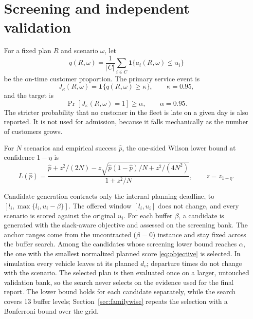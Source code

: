 \documentclass[11pt,a4paper]{article}
\begin{document}
\section{Screening and independent validation}

For a fixed plan $R$ and scenario $\omega$, let
\begin{equation}
 q(R,\omega)=\frac{1}{|C|}\sum_{i\in C}
 \mathbf{1}\{a_i(R,\omega)\leq u_i\}
\end{equation}
be the on-time customer proportion. The primary service event is
\begin{equation}
 J_{\kappa}(R,\omega)=\mathbf{1}\{q(R,\omega)\geq\kappa\},
 \qquad \kappa=0.95,                                        \label{eq:event}
\end{equation}
and the target is
\begin{equation}
 \Pr[J_{\kappa}(R,\omega)=1]\geq\alpha,
 \qquad \alpha=0.95.                                       \label{eq:chance}
\end{equation}
The stricter probability that no customer in the fleet is late on a given day
is also reported. It is not used for admission, because it falls mechanically as
the number of customers grows.

For $N$ scenarios and empirical success $\hat p$, the one-sided Wilson lower
bound at confidence $1-\eta$ is
\begin{equation}
 L(\hat p)=
 \frac{\hat p+z^2/(2N)-z\sqrt{\hat p(1-\hat p)/N+z^2/(4N^2)}}
 {1+z^2/N},\qquad z=z_{1-\eta}.                             \label{eq:wilson}
\end{equation}

Candidate generation contracts only the internal planning deadline, to
$[l_i,\max\{l_i,u_i-\beta\}]$. The offered window $[l_i,u_i]$ does not change,
and every scenario is scored against the original $u_i$. For each buffer
$\beta$, a candidate is generated with the slack-aware objective and assessed on
the screening bank. The anchor ranges come from the uncontracted ($\beta=0$)
instance and stay fixed across the buffer search. Among the candidates whose
screening lower bound reaches $\alpha$, the one with the smallest normalized
planned score \eqref{eq:objective} is selected. In simulation every vehicle
leaves at its planned $d_v$; departure times do not change with the scenario.
The selected plan is then evaluated once on a larger, untouched validation bank,
so the search never selects on the evidence used for the final report. The
lower bound holds for each candidate separately, while the search covers 13
buffer levels; Section~\ref{sec:familywise} repeats the selection with a
Bonferroni bound over the grid.
\end{document}
